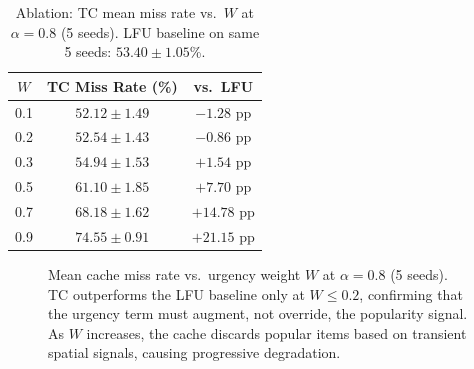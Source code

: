 \documentclass[preprint,12pt]{elsarticle}
\begin{document}
	\begin{table}[t]
		\centering
		\renewcommand{\arraystretch}{1.1}
		\caption{Ablation: TC mean miss rate vs.\ $W$ at $\alpha=0.8$ (5 seeds). LFU baseline on same 5 seeds: $53.40 \pm 1.05$\%.}
		\label{tab:ablation}
		\begin{tabular}{ccc}
			\toprule
			$W$ & \textbf{TC Miss Rate (\%)} & \textbf{vs.\ LFU} \\
			\midrule
			0.1 & $52.12 \pm 1.49$ & $-1.28$ pp \\
			0.2 & $52.54 \pm 1.43$ & $-0.86$ pp \\
			0.3 & $54.94 \pm 1.53$ & $+1.54$ pp \\
			0.5 & $61.10 \pm 1.85$ & $+7.70$ pp \\
			0.7 & $68.18 \pm 1.62$ & $+14.78$ pp \\
			0.9 & $74.55 \pm 0.91$ & $+21.15$ pp \\
			\bottomrule
		\end{tabular}
	\end{table}
	
	\begin{figure}[t]
		\centering
		\caption{Mean cache miss rate vs.\ urgency weight $W$ at $\alpha=0.8$ (5 seeds). TC outperforms the LFU baseline only at $W \leq 0.2$, confirming that the urgency term must augment, not override, the popularity signal. As $W$ increases, the cache discards popular items based on transient spatial signals, causing progressive degradation.}
		\label{fig:wsweep}
	\end{figure}
	
\end{document}
